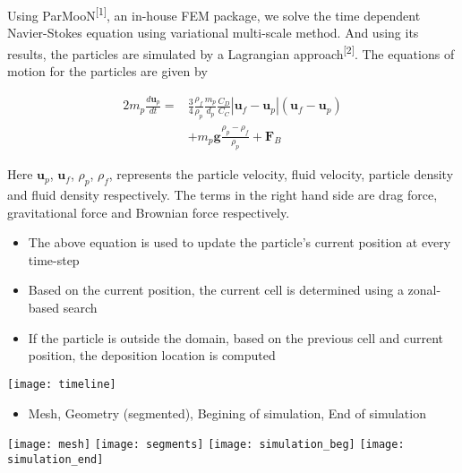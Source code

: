 
Using ParMooN\textsuperscript{[1]}, an in-house FEM package, we solve the time dependent Navier-Stokes equation using variational multi-scale method. And using its results, the particles are simulated by a Lagrangian approach\textsuperscript{[2]}. The equations of motion for the particles are given by

\begin{alignat*}{2}
     m_p\frac{d\mathbf{u}_p}{dt} =& \frac{3}{4}\frac{\rho_f}{\rho_p}\frac{m_p}{d_p}\frac{C_D}{C_C}\left|\mathbf{u}_f - \mathbf{u}_p\right|\left(\mathbf{u}_f - \mathbf{u}_p\right)  \\
     &+ m_p\mathbf{g}\frac{\rho_p - \rho_f}{\rho_p} + \mathbf{F}_B
\end{alignat*}

Here $\mathbf{u}_p$, $\mathbf{u}_f$, $\rho_p$, $\rho_f$,  represents the particle velocity, fluid velocity, particle density and fluid density respectively. The terms in the right hand side are drag force, gravitational force and Brownian force respectively.

\begin{itemize}
\item The above equation is used to update the particle's current position at every time-step
\item Based on the current position, the current cell is determined using a zonal-based search
\item If the particle is outside the domain, based on the previous cell and current position, the deposition location is computed
\end{itemize}

\vspace{0.3cm}
\begin{center}
  \vspace{-0.4cm}
  \texttt{[image: timeline]}
\end{center}

\begin{itemize}
\item Mesh, Geometry (segmented), Begining of simulation, End of simulation
\end{itemize}
\vspace{0.1cm}
\begin{center}
  \vspace{-0.4cm}
  \texttt{[image: mesh]}%
  \texttt{[image: segments]}\hspace{0.2cm}
  \texttt{[image: simulation\_beg]}%
  \texttt{[image: simulation\_end]}
\end{center}

